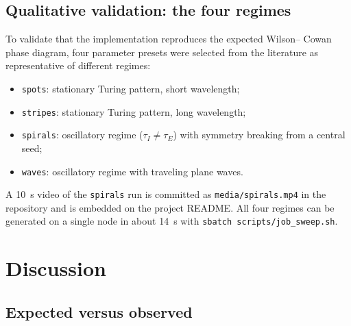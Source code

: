 \documentclass[11pt]{article}
\begin{document}
\subsection{Qualitative validation: the four regimes}

To validate that the implementation reproduces the expected Wilson--
Cowan phase diagram, four parameter presets were selected from the
literature as representative of different regimes:

\begin{itemize}
  \item \texttt{spots}: stationary Turing pattern, short wavelength;
  \item \texttt{stripes}: stationary Turing pattern, long wavelength;
  \item \texttt{spirals}: oscillatory regime ($\tau_{I} \neq \tau_{E}$)
    with symmetry breaking from a central seed;
  \item \texttt{waves}: oscillatory regime with traveling plane waves.
\end{itemize}

A \SI{10}{\second} video of the \texttt{spirals} run is committed as
\texttt{media/spirals.mp4} in the repository and is embedded on the
project README. All four regimes can be generated on a single node in
about \SI{14}{\second} with \texttt{sbatch scripts/job\_sweep.sh}.

\section{Discussion}
\label{sec:discussion}

\subsection{Expected versus observed}
\end{document}
